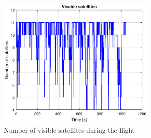 \begin{figure}[H]
	\centering
		\includegraphics[width=0.7\textwidth]{figs/plots/numSatFlight.eps}
		\caption{Number of visible satellites during the flight}
		\label{figure:numSatFlight}
\end{figure}
